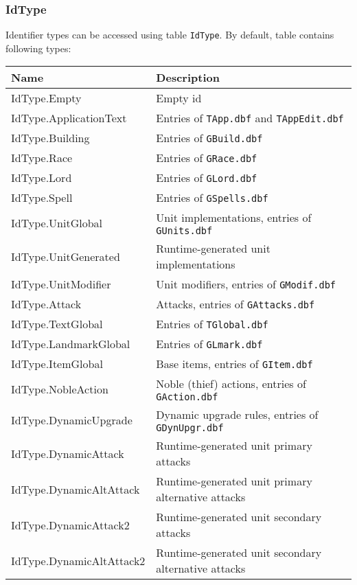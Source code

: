 \subsubsection{IdType}
\label{IdType}
Identifier types can be accessed using table \texttt{IdType}.
By default, table contains following types:\\
\begin{tabularx}{\linewidth}{| l | X |}
\hline
\textbf{Name} & \textbf{Description} \\
\hline
IdType.Empty & Empty id\\
\hline
IdType.ApplicationText & Entries of \texttt{TApp.dbf} and \texttt{TAppEdit.dbf}\\
\hline
IdType.Building & Entries of \texttt{GBuild.dbf}\\
\hline
IdType.Race & Entries of \texttt{GRace.dbf}\\
\hline
IdType.Lord & Entries of \texttt{GLord.dbf}\\
\hline
IdType.Spell & Entries of \texttt{GSpells.dbf}\\
\hline
IdType.UnitGlobal & Unit implementations, entries of \texttt{GUnits.dbf}\\
\hline
IdType.UnitGenerated & Runtime-generated unit implementations\\
\hline
IdType.UnitModifier & Unit modifiers, entries of \texttt{GModif.dbf}\\
\hline
IdType.Attack & Attacks, entries of \texttt{GAttacks.dbf}\\
\hline
IdType.TextGlobal & Entries of \texttt{TGlobal.dbf}\\
\hline
IdType.LandmarkGlobal & Entries of \texttt{GLmark.dbf}\\
\hline
IdType.ItemGlobal & Base items, entries of \texttt{GItem.dbf}\\
\hline
IdType.NobleAction & Noble (thief) actions, entries of \texttt{GAction.dbf}\\
\hline
IdType.DynamicUpgrade & Dynamic upgrade rules, entries of \texttt{GDynUpgr.dbf}\\
\hline
IdType.DynamicAttack & Runtime-generated unit primary attacks\\
\hline
IdType.DynamicAltAttack & Runtime-generated unit primary alternative attacks\\
\hline
IdType.DynamicAttack2 & Runtime-generated unit secondary attacks\\
\hline
IdType.DynamicAltAttack2 & Runtime-generated unit secondary alternative attacks\\

\end{tabularx}

